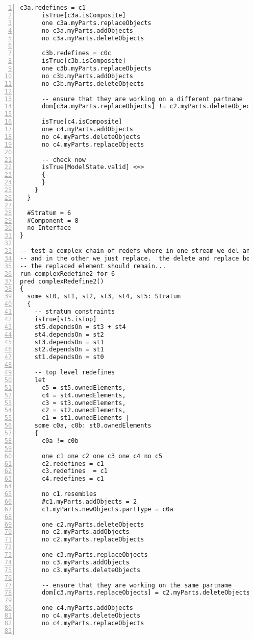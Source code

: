 \begin{lstlisting}[caption={unittests\_redefinition.als}, numbers=left]
      c3a.redefines = c1
      isTrue[c3a.isComposite]
      one c3a.myParts.replaceObjects
      no c3a.myParts.addObjects
      no c3a.myParts.deleteObjects

      c3b.redefines = c0c
      isTrue[c3b.isComposite]
      one c3b.myParts.replaceObjects
      no c3b.myParts.addObjects
      no c3b.myParts.deleteObjects
            
      -- ensure that they are working on a different partname
      dom[c3a.myParts.replaceObjects] != c2.myParts.deleteObjects
      
      isTrue[c4.isComposite]
      one c4.myParts.addObjects
      no c4.myParts.deleteObjects
      no c4.myParts.replaceObjects
      
      -- check now
      isTrue[ModelState.valid] <=>
      {
      }
    }
  }

  #Stratum = 6
  #Component = 8
  no Interface
}

-- test a complex chain of redefs where in one stream we del and then add on top of that
-- and in the other we just replace.  the delete and replace both work on the same partname
-- the replaced element should remain...
run complexRedefine2 for 6
pred complexRedefine2()
{
  some st0, st1, st2, st3, st4, st5: Stratum
  {
    -- stratum constraints
    isTrue[st5.isTop]
    st5.dependsOn = st3 + st4
    st4.dependsOn = st2
    st3.dependsOn = st1
    st2.dependsOn = st1
    st1.dependsOn = st0

    -- top level redefines
    let
      c5 = st5.ownedElements,
      c4 = st4.ownedElements,
      c3 = st3.ownedElements,
      c2 = st2.ownedElements,
      c1 = st1.ownedElements |
    some c0a, c0b: st0.ownedElements
    {
      c0a != c0b
      
      one c1 one c2 one c3 one c4 no c5
      c2.redefines = c1
      c3.redefines  = c1
      c4.redefines = c1
  
      no c1.resembles
      #c1.myParts.addObjects = 2
      c1.myParts.newObjects.partType = c0a
      
      one c2.myParts.deleteObjects
      no c2.myParts.addObjects
      no c2.myParts.replaceObjects
      
      one c3.myParts.replaceObjects
      no c3.myParts.addObjects
      no c3.myParts.deleteObjects
      
      -- ensure that they are working on the same partname
      dom[c3.myParts.replaceObjects] = c2.myParts.deleteObjects
      
      one c4.myParts.addObjects
      no c4.myParts.deleteObjects
      no c4.myParts.replaceObjects
      

\end{lstlisting}
